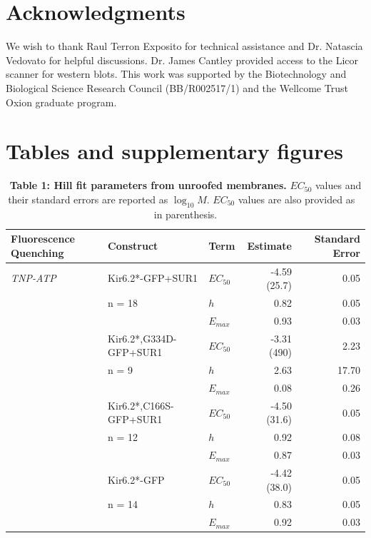 \documentclass[10pt,lineno, doublespacing]{elife}
\begin{document}
\section{Acknowledgments}
We wish to thank Raul Terron Exposito for technical assistance and Dr. Natascia Vedovato for helpful discussions.
Dr. James Cantley provided access to the Licor scanner for western blots.
This work was supported by the Biotechnology and Biological Science Research Council (BB/R002517/1) and the Wellcome Trust Oxion graduate program.



\FloatBarrier

\section{Tables and supplementary figures}
\begin{table}
\centering\begingroup
\begin{tabular}{p{32mm} l l r r}
\toprule
\textbf{Fluorescence Quenching} & Construct & Term & Estimate & Standard Error\\
\midrule
\textit{TNP-ATP} & Kir6.2*-GFP+SUR1       & $EC_{50}$ & -4.59 (25.7) & 0.05\\
                 & n = 18                 & $h$       & 0.82         & 0.05\\
                 &                        & $E_{max}$ & 0.93         & 0.03\\
\cmidrule{2-5}
                 & Kir6.2*,G334D-GFP+SUR1 & $EC_{50}$ & -3.31 (490)  & 2.23\\
                 & n = 9                  & $h$       & 2.63         & 17.70\\
                 &                        & $E_{max}$ & 0.08         & 0.26\\
\cmidrule{2-5}
                 & Kir6.2*,C166S-GFP+SUR1 & $EC_{50}$ & -4.50 (31.6) & 0.05\\
                 & n = 12                 & $h$       & 0.92         & 0.08\\
                 &                        & $E_{max}$ & 0.87         & 0.03\\
\cmidrule{2-5}
                 & Kir6.2*-GFP           & $EC_{50}$  & -4.42 (38.0) & 0.05\\
                 & n = 14                & $h$        & 0.83         & 0.05\\
                 &                       & $E_{max}$  & 0.92         & 0.03\\
\midrule
\end{tabular}
\caption{\label{table:um} \textbf{Table 1: Hill fit parameters from unroofed membranes.} $EC_{50}$ values and their standard errors are reported as $\log_{10}M$. $EC_{50}$ values are also provided as \si{\micro\Molar} in parenthesis.}
\endgroup{}
\end{table}
\end{document}
